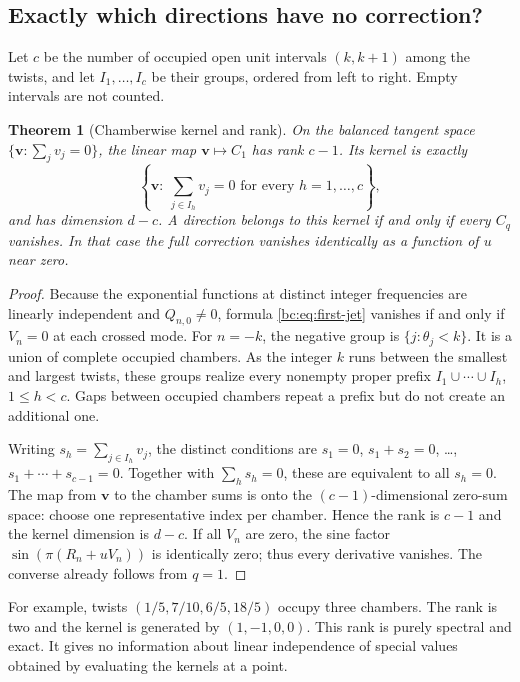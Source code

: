 \documentclass[11pt,letterpaper]{article}
\numberwithin{equation}{section}
\newtheorem{theorem}{Theorem}[section]
\theoremstyle{definition}
\theoremstyle{remark}
\begin{document}
\subsection{Exactly which directions have no correction?}

Let $c$ be the number of occupied open unit intervals $(k,k+1)$ among the
twists, and let $I_1,\ldots,I_c$ be their groups, ordered from left to
right. Empty intervals are not counted.

\begin{theorem}[Chamberwise kernel and rank]\label{bc:thm:rank}
On the balanced tangent space $\{\bm v:\sum_jv_j=0\}$, the linear map
$\bm v\mapsto C_1$ has rank $c-1$. Its kernel is exactly
\begin{equation}\label{bc:eq:chamber-kernel}
 \left\{\bm v:\ \sum_{j\in I_h}v_j=0\text{ for every }h=1,\ldots,c\right\},
\end{equation}
and has dimension $d-c$. A direction belongs to this kernel if and only
if \emph{every} $C_q$ vanishes. In that case the full correction vanishes
identically as a function of $u$ near zero.
\end{theorem}
\begin{proof}
Because the exponential functions at distinct integer frequencies are
linearly independent and $Q_{n,0}\ne0$, formula
\eqref{bc:eq:first-jet} vanishes if and only if $V_n=0$ at each crossed
mode. For $n=-k$, the negative group is $\{j:\theta_j<k\}$. It is a union
of complete occupied chambers. As the integer $k$ runs between the
smallest and largest twists, these groups realize every nonempty proper
prefix $I_1\cup\cdots\cup I_h$, $1\le h<c$. Gaps between occupied
chambers repeat a prefix but do not create an additional one.

Writing $s_h=\sum_{j\in I_h}v_j$, the distinct conditions are
$s_1=0$, $s_1+s_2=0$, \ldots, $s_1+\cdots+s_{c-1}=0$. Together with
$\sum_hs_h=0$, these are equivalent to all $s_h=0$. The map from $\bm v$
to the chamber sums is onto the $(c-1)$-dimensional zero-sum space:
choose one representative index per chamber. Hence the rank is $c-1$
and the kernel dimension is $d-c$. If all $V_n$ are zero, the sine
factor $\sin(\pi(R_n+uV_n))$ is identically zero; thus every derivative
vanishes. The converse already follows from $q=1$.
\end{proof}

For example, twists $(1/5,7/10,6/5,18/5)$ occupy three chambers. The rank
is two and the kernel is generated by $(1,-1,0,0)$. This rank is purely
spectral and exact. It gives no information about linear independence of
special values obtained by evaluating the kernels at a point.
\end{document}
